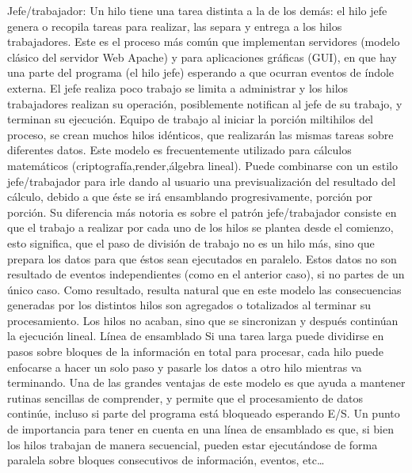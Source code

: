\documentclass[11pt]{article}
\begin{document}
Jefe/trabajador: Un hilo tiene una tarea distinta a la de los demás: el hilo jefe genera o recopila tareas para realizar, las separa y entrega a los hilos trabajadores.
Este es el proceso más común que implementan servidores (modelo clásico del servidor Web Apache) y para aplicaciones gráficas (GUI), en que hay una parte del programa (el hilo jefe) esperando a que ocurran eventos de índole externa. El jefe realiza poco trabajo se limita a administrar y los hilos trabajadores realizan su operación, posiblemente notifican al jefe de su trabajo, y terminan su ejecución.
Equipo de trabajo al iniciar la porción miltihilos del proceso, se crean muchos hilos idénticos, que realizarán las mismas tareas sobre diferentes datos. Este modelo es frecuentemente utilizado para cálculos matemáticos (criptografía,render,álgebra lineal). Puede combinarse con un estilo jefe/trabajador para irle dando al usuario una previsualización del resultado del cálculo, debido a que éste se irá ensamblando progresivamente, porción por porción.
Su diferencia más notoria es sobre el patrón jefe/trabajador consiste en que el trabajo a realizar por cada uno de los hilos se plantea desde el comienzo, esto significa, que el paso de división de trabajo no es un hilo más, sino que prepara los datos para que éstos sean ejecutados en paralelo. Estos datos no son resultado de eventos independientes (como en el anterior caso), si no partes de un único caso. Como resultado, resulta natural que en este modelo las consecuencias generadas por los distintos hilos son agregados o totalizados al terminar su procesamiento. Los hilos no acaban, sino que se sincronizan y después continúan la ejecución lineal.
Línea de ensamblado Si una tarea larga puede dividirse en pasos sobre bloques de la información en total para procesar, cada hilo puede enfocarse a hacer un solo paso y pasarle los datos a otro hilo mientras va terminando. Una de las grandes ventajas de este modelo es que ayuda a mantener rutinas sencillas de comprender, y permite que el procesamiento de datos continúe, incluso si parte del programa está bloqueado esperando E/S.
Un punto de importancia para tener en cuenta en  una línea de ensamblado es que, si bien los hilos trabajan de manera secuencial, pueden estar ejecutándose de forma paralela sobre bloques consecutivos de información, eventos, etc…




\medskip

 
 
\end{document}
